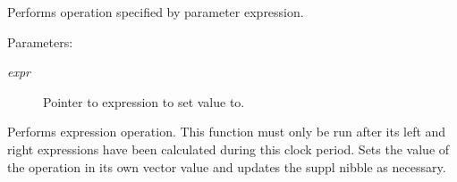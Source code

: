 Performs operation specified by parameter expression.

\begin{Desc}
\item[Parameters: ]\par
\begin{description}
\item[{\em 
expr}]Pointer to expression to set value to.\end{description}
\end{Desc}
Performs expression operation. This function must only be run after its left and right expressions have been calculated during this clock period. Sets the value of the operation in its own vector value and updates the suppl nibble as necessary. 